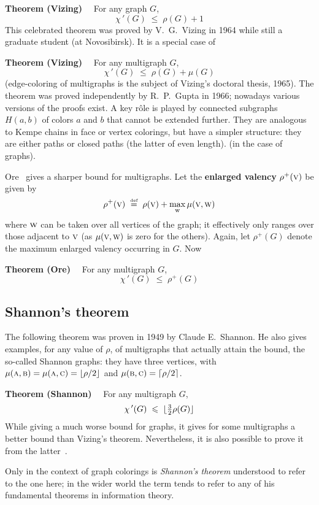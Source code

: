 \documentclass[12pt]{article}
\let\le\leqslant
\let\T\textstyle
\let\S\scriptstyle
\let\SS\scriptscriptstyle
\def\frac#1#2{\mathord{\mathchoice%
{\T{#1\over#2}}
{\T{#1\over#2}}
{\S{#1\over#2}}
{\SS{#1\over#2}}}}
\def\isdef{\mathrel{\mathop{=}\limits^{\smash{\hbox{\tiny def}}}}}
\def\0#1{\hbox{\sc #1}}  %
\begin{document}
{\bf Theorem (Vizing)}$\quad$
For any graph $G$,
$$
  {\chi\,}'(G) \;\le\; \rho(G)+1
$$
This celebrated theorem was proved by V.~G.~Vizing in 1964 while still a
graduate student (at Novosibirsk). It is a special case of

{\bf Theorem (Vizing)}$\quad$
For any multigraph $G$,
$$
  {\chi\,}'(G) \;\le\; \rho(G)+\mu(G)
$$
(edge-coloring of multigraphs is the subject of Vizing's doctoral thesis, 1965).
The theorem was proved independently by R.~P.~Gupta in 1966; nowadays various
versions of the proofs exist. A key r\^ole is played by connected subgraphs $H(a,b)$ of colors $a$ and $b$ that cannot be extended further. They are analogous to Kempe chains in face or vertex colorings, but have a simpler structure: they are either paths or closed paths (the latter of even length).  (in the case of graphs).

Ore~\cite{Ore67} gives a sharper bound for multigraphs. Let the
{\bf enlarged valency} $\rho^+(\0v)$ be given by
$$
  \rho^+(\0v) \;\isdef\; \rho(\0v) + \max_{\rm w} \mu(\0v,\0w)
$$
where $\0w$ can be taken over all vertices of the graph; it effectively only
ranges over those adjacent to $\0v$ (as $\mu(\0v,\0w)$ is zero for the others).
Again, let $\rho^+(G)$ denote the maximum enlarged valency occurring in
$G$. Now

{\bf Theorem (Ore)}$\quad$ For any multigraph $G$,
$$
  {\chi\,}'(G) \;\le\; \rho^+(G)
$$

\subsection*{Shannon's theorem}

The following theorem was proven in 1949 by
Claude E.~Shannon. He also gives examples, for any value of $\rho$, of
multigraphs that actually attain the bound,
the so-called Shannon graphs: they have three vertices, with
$\mu(\0a,\0b)=\mu(\0a,\0c)=\lfloor\rho/2\rfloor$ and
$\mu(\0b,\0c)=\lceil\rho/2\rceil$.

{\bf Theorem (Shannon)}$\quad$ For any multigraph $G$,
$$
  {\chi\,}'(G) \;\le\; \lfloor\frac32\rho(G)\rfloor
$$
While giving a much worse bound for graphs, it gives for some multigraphs a
better bound than Vizing's theorem. Nevertheless, it is also possible to prove
it from the latter~\cite{FW77}.

Only in the context of graph colorings is {\em Shannon's theorem\/} understood
to refer to the one here; in the wider world the term tends to refer to any of
his fundamental theorems in information theory.
\end{document}
